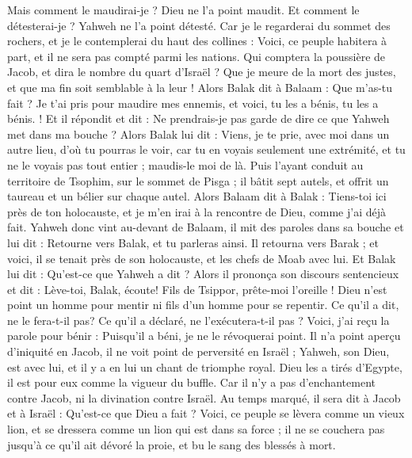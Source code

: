 \begin{multicols}{2}
Mais comment le maudirai-je ? Dieu ne l'a point maudit. Et comment le détesterai-je ? Yahweh ne l'a point détesté.
Car je le regarderai du sommet des rochers, et je le contemplerai du haut des collines : Voici, ce peuple habitera à part, et il ne sera pas compté parmi les nations.
Qui comptera la poussière de Jacob, et dira le nombre du quart d'Israël ? Que je meure de la mort des justes, et que ma fin soit semblable à la leur !
Alors Balak dit à Balaam : Que m'as-tu fait ? Je t'ai pris pour maudire mes ennemis, et voici, tu les a bénis, tu les a bénis. !
Et il répondit et dit : Ne prendrais-je pas garde de dire ce que Yahweh met dans ma bouche ?
Alors Balak lui dit : Viens, je te prie, avec moi dans un autre lieu, d'où tu pourras le voir, car tu en voyais seulement une extrémité, et tu ne le voyais pas tout entier ; maudis-le moi de là.
Puis l'ayant conduit au territoire de Tsophim, sur le sommet de Pisga ; il bâtit sept autels, et offrit un taureau et un bélier sur chaque autel.
Alors Balaam dit à Balak : Tiens-toi ici près de ton holocauste, et je m'en irai à la rencontre de Dieu, comme j'ai déjà fait.
Yahweh donc vint au-devant de Balaam, il mit des paroles dans sa bouche et lui dit : Retourne vers Balak, et tu parleras ainsi.
Il retourna vers Barak ; et voici, il se tenait près de son holocauste, et les chefs de Moab avec lui. Et Balak lui dit : Qu'est-ce que Yahweh a dit ?
Alors il prononça son discours sentencieux et dit : Lève-toi, Balak, écoute! Fils de Tsippor, prête-moi l'oreille !
Dieu n'est point un homme pour mentir ni fils d'un homme pour se repentir. Ce qu'il a dit, ne le fera-t-il pas? Ce qu'il a déclaré, ne l'exécutera-t-il pas ?
Voici, j'ai reçu la parole pour bénir : Puisqu'il a béni, je ne le révoquerai point.
Il n'a point aperçu d'iniquité en Jacob, il ne voit point de perversité en Israël ; Yahweh, son Dieu, est avec lui, et il y a en lui un chant de triomphe royal.
Dieu les a tirés d'Egypte, il est pour eux comme la vigueur du buffle.
 Car il n'y a pas d'enchantement contre Jacob, ni la divination contre Israël. Au temps marqué, il sera dit à Jacob et à Israël : Qu'est-ce que Dieu a fait ?
Voici, ce peuple se lèvera comme un vieux lion, et se dressera comme un lion qui est dans sa force ; il ne se couchera pas jusqu'à ce qu'il ait dévoré la proie, et bu le sang des blessés à mort.

\end{multicols}
